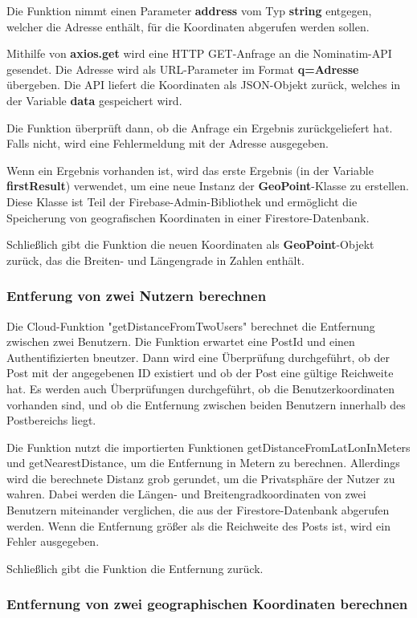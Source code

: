 Die Funktion nimmt einen Parameter \textbf{address} vom Typ \textbf{string} entgegen, welcher die Adresse enthält, für die Koordinaten abgerufen werden sollen.

Mithilfe von \textbf{axios.get} wird eine HTTP GET-Anfrage an die Nominatim-API gesendet. Die Adresse wird als URL-Parameter im Format \textbf{q=Adresse} übergeben. Die API liefert die Koordinaten als JSON-Objekt zurück, welches in der Variable \textbf{data} gespeichert wird.

Die Funktion überprüft dann, ob die Anfrage ein Ergebnis zurückgeliefert hat. Falls nicht, wird eine Fehlermeldung mit der Adresse ausgegeben.

Wenn ein Ergebnis vorhanden ist, wird das erste Ergebnis (in der Variable \textbf{firstResult}) verwendet, um eine neue Instanz der \textbf{GeoPoint}-Klasse zu erstellen. Diese Klasse ist Teil der Firebase-Admin-Bibliothek und ermöglicht die Speicherung von geografischen Koordinaten in einer Firestore-Datenbank.

Schließlich gibt die Funktion die neuen Koordinaten als \textbf{GeoPoint}-Objekt zurück, das die Breiten- und Längengrade in Zahlen enthält.

\subsubsection{Entferung von zwei Nutzern berechnen}
Die Cloud-Funktion "getDistanceFromTwoUsers" berechnet die
Entfernung zwischen zwei Benutzern. Die Funktion erwartet
eine PostId und einen Authentifizierten bneutzer. Dann wird eine
Überprüfung durchgeführt, ob der Post mit der angegebenen ID
existiert und ob der Post eine gültige Reichweite hat. Es
werden auch Überprüfungen durchgeführt, ob die
Benutzerkoordinaten vorhanden sind, und ob die Entfernung
zwischen beiden Benutzern innerhalb des Postbereichs liegt.

Die Funktion nutzt die importierten Funktionen
getDistanceFromLatLonInMeters und getNearestDistance, um die
Entfernung in Metern zu berechnen. Allerdings wird die
berechnete Distanz grob gerundet, um die Privatsphäre der
Nutzer zu wahren. Dabei
werden die Längen- und Breitengradkoordinaten von zwei
Benutzern miteinander verglichen, die aus der
Firestore-Datenbank abgerufen werden. Wenn die Entfernung
größer als die Reichweite des Posts ist, wird ein Fehler
ausgegeben.

Schließlich gibt die Funktion die Entfernung zurück.

\subsubsection{Entfernung von zwei geographischen Koordinaten berechnen}

